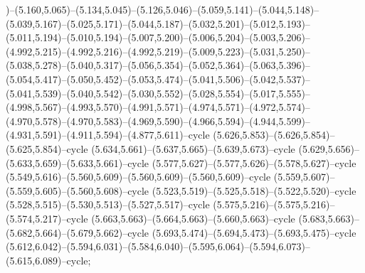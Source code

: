 )--(5.160,5.065)--(5.134,5.045)--(5.126,5.046)--(5.059,5.141)--(5.044,5.148)--(5.039,5.167)--(5.025,5.171)--(5.044,5.187)--(5.032,5.201)--(5.012,5.193)--(5.011,5.194)--(5.010,5.194)--(5.007,5.200)--(5.006,5.204)--(5.003,5.206)--(4.992,5.215)--(4.992,5.216)--(4.992,5.219)--(5.009,5.223)--(5.031,5.250)--(5.038,5.278)--(5.040,5.317)--(5.056,5.354)--(5.052,5.364)--(5.063,5.396)--(5.054,5.417)--(5.050,5.452)--(5.053,5.474)--(5.041,5.506)--(5.042,5.537)--(5.041,5.539)--(5.040,5.542)--(5.030,5.552)--(5.028,5.554)--(5.017,5.555)--(4.998,5.567)--(4.993,5.570)--(4.991,5.571)--(4.974,5.571)--(4.972,5.574)--(4.970,5.578)--(4.970,5.583)--(4.969,5.590)--(4.966,5.594)--(4.944,5.599)--(4.931,5.591)--(4.911,5.594)--(4.877,5.611)--cycle (5.626,5.853)--(5.626,5.854)--(5.625,5.854)--cycle (5.634,5.661)--(5.637,5.665)--(5.639,5.673)--cycle (5.629,5.656)--(5.633,5.659)--(5.633,5.661)--cycle (5.577,5.627)--(5.577,5.626)--(5.578,5.627)--cycle (5.549,5.616)--(5.560,5.609)--(5.560,5.609)--(5.560,5.609)--cycle (5.559,5.607)--(5.559,5.605)--(5.560,5.608)--cycle (5.523,5.519)--(5.525,5.518)--(5.522,5.520)--cycle (5.528,5.515)--(5.530,5.513)--(5.527,5.517)--cycle (5.575,5.216)--(5.575,5.216)--(5.574,5.217)--cycle (5.663,5.663)--(5.664,5.663)--(5.660,5.663)--cycle (5.683,5.663)--(5.682,5.664)--(5.679,5.662)--cycle (5.693,5.474)--(5.694,5.473)--(5.693,5.475)--cycle (5.612,6.042)--(5.594,6.031)--(5.584,6.040)--(5.595,6.064)--(5.594,6.073)--(5.615,6.089)--cycle;
